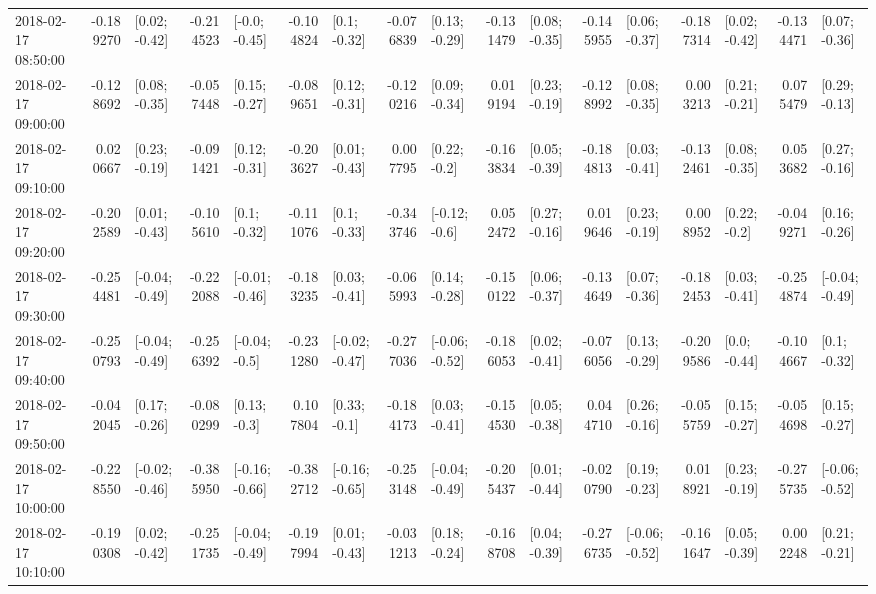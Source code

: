 \begin{tabular}{lrlrlrlrlrlrlrlrl}
2018-02-17 08:50:00 & -0.189270 &   [0.02; -0.42] & -0.214523 &   [-0.0; -0.45] & -0.104824 &    [0.1; -0.32] & -0.076839 &   [0.13; -0.29] & -0.131479 &   [0.08; -0.35] & -0.145955 &   [0.06; -0.37] & -0.187314 &   [0.02; -0.42] & -0.134471 &   [0.07; -0.36] \\
2018-02-17 09:00:00 & -0.128692 &   [0.08; -0.35] & -0.057448 &   [0.15; -0.27] & -0.089651 &   [0.12; -0.31] & -0.120216 &   [0.09; -0.34] &  0.019194 &   [0.23; -0.19] & -0.128992 &   [0.08; -0.35] &  0.003213 &   [0.21; -0.21] &  0.075479 &   [0.29; -0.13] \\
2018-02-17 09:10:00 &  0.020667 &   [0.23; -0.19] & -0.091421 &   [0.12; -0.31] & -0.203627 &   [0.01; -0.43] &  0.007795 &    [0.22; -0.2] & -0.163834 &   [0.05; -0.39] & -0.184813 &   [0.03; -0.41] & -0.132461 &   [0.08; -0.35] &  0.053682 &   [0.27; -0.16] \\
2018-02-17 09:20:00 & -0.202589 &   [0.01; -0.43] & -0.105610 &    [0.1; -0.32] & -0.111076 &    [0.1; -0.33] & -0.343746 &   [-0.12; -0.6] &  0.052472 &   [0.27; -0.16] &  0.019646 &   [0.23; -0.19] &  0.008952 &    [0.22; -0.2] & -0.049271 &   [0.16; -0.26] \\
2018-02-17 09:30:00 & -0.254481 &  [-0.04; -0.49] & -0.222088 &  [-0.01; -0.46] & -0.183235 &   [0.03; -0.41] & -0.065993 &   [0.14; -0.28] & -0.150122 &   [0.06; -0.37] & -0.134649 &   [0.07; -0.36] & -0.182453 &   [0.03; -0.41] & -0.254874 &  [-0.04; -0.49] \\
2018-02-17 09:40:00 & -0.250793 &  [-0.04; -0.49] & -0.256392 &   [-0.04; -0.5] & -0.231280 &  [-0.02; -0.47] & -0.277036 &  [-0.06; -0.52] & -0.186053 &   [0.02; -0.41] & -0.076056 &   [0.13; -0.29] & -0.209586 &    [0.0; -0.44] & -0.104667 &    [0.1; -0.32] \\
2018-02-17 09:50:00 & -0.042045 &   [0.17; -0.26] & -0.080299 &    [0.13; -0.3] &  0.107804 &    [0.33; -0.1] & -0.184173 &   [0.03; -0.41] & -0.154530 &   [0.05; -0.38] &  0.044710 &   [0.26; -0.16] & -0.055759 &   [0.15; -0.27] & -0.054698 &   [0.15; -0.27] \\
2018-02-17 10:00:00 & -0.228550 &  [-0.02; -0.46] & -0.385950 &  [-0.16; -0.66] & -0.382712 &  [-0.16; -0.65] & -0.253148 &  [-0.04; -0.49] & -0.205437 &   [0.01; -0.44] & -0.020790 &   [0.19; -0.23] &  0.018921 &   [0.23; -0.19] & -0.275735 &  [-0.06; -0.52] \\
2018-02-17 10:10:00 & -0.190308 &   [0.02; -0.42] & -0.251735 &  [-0.04; -0.49] & -0.197994 &   [0.01; -0.43] & -0.031213 &   [0.18; -0.24] & -0.168708 &   [0.04; -0.39] & -0.276735 &  [-0.06; -0.52] & -0.161647 &   [0.05; -0.39] &  0.002248 &   [0.21; -0.21] \\

\end{tabular}
